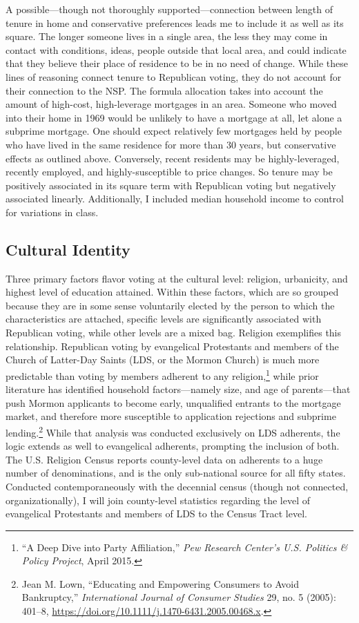 \documentclass[12pt,oneside]{psthesis}
\begin{document}
A possible---though not thoroughly supported---connection between length of tenure in home and conservative preferences leads me to include it as well as its square.
The longer someone lives in a single area, the less they may come in contact with conditions, ideas, people outside that local area, and could indicate that they believe their place of residence to be in no need of change.
While these lines of reasoning connect tenure to Republican voting, they do not account for their connection to the NSP.
The formula allocation takes into account the amount of high-cost, high-leverage mortgages in an area.
Someone who moved into their home in 1969 would be unlikely to have a mortgage at all, let alone a subprime mortgage.
One should expect relatively few mortgages held by people who have lived in the same residence for more than 30 years, but conservative effects as outlined above.
Conversely, recent residents may be highly-leveraged, recently employed, and highly-susceptible to price changes.
So tenure may be positively associated in its square term with Republican voting but negatively associated linearly.
Additionally, I included median household income to control for variations in class.

\hypertarget{cultural-identity}{%
\subsection{Cultural Identity}\label{cultural-identity}}

Three primary factors flavor voting at the cultural level: religion, urbanicity, and highest level of education attained.
Within these factors, which are so grouped because they are in some sense voluntarily elected by the person to which the characteristics are attached, specific levels are significantly associated with Republican voting, while other levels are a mixed bag.
Religion exemplifies this relationship.
Republican voting by evangelical Protestants and members of the Church of Latter-Day Saints (LDS, or the Mormon Church) is much more predictable than voting by members adherent to any religion,\footnote{``A Deep Dive into Party Affiliation,'' \emph{Pew Research Center's U.S. Politics \& Policy Project}, April 2015.} while prior literature has identified household factors---namely size, and age of parents---that push Mormon applicants to become early, unqualified entrants to the mortgage market, and therefore more susceptible to application rejections and subprime lending.\footnote{Jean M. Lown, ``Educating and Empowering Consumers to Avoid Bankruptcy,'' \emph{International Journal of Consumer Studies} 29, no. 5 (2005): 401--8, \url{https://doi.org/10.1111/j.1470-6431.2005.00468.x}.}
While that analysis was conducted exclusively on LDS adherents, the logic extends as well to evangelical adherents, prompting the inclusion of both.
The U.S. Religion Census reports county-level data on adherents to a huge number of denominations, and is the only sub-national source for all fifty states.
Conducted contemporaneously with the decennial census (though not connected, organizationally), I will join county-level statistics regarding the level of evangelical Protestants and members of LDS to the Census Tract level.
\end{document}

